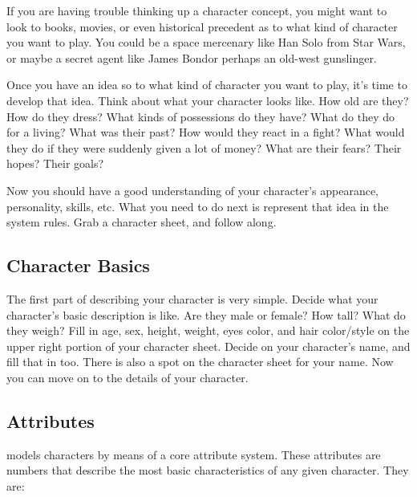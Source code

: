 \documentclass[twoside]{book}
\begin{document}
    {  
    If you are having trouble thinking up a character
             concept, you might want to look to books, movies, or even
             historical precedent as to what kind of character you want
             to play. You could be a space mercenary like Han Solo from
             Star Wars, or maybe a secret agent like James Bondor
             perhaps an old-west gunslinger. 
    }
  
    {  
    Once you have an idea so to what kind of character you
             want to play, it's time to develop that idea. Think
             about what your character looks like. How old are they? How
             do they dress? What kinds of possessions do they have? What
             do they do for a living? What was their past? How would they
             react in a fight? What would they do if they were suddenly
             given a lot of money? What are their fears? Their hopes?
             Their goals? 
    }
  
    {  
    Now you should have a good understanding of your
            character's appearance, personality, skills, etc. What
            you need to do next is represent that idea in the \APATHY{} 
            system rules. Grab a character sheet, and follow along.
          
    }
  
    

\subsection{Character Basics}
    
    {  
    The first part of describing your character is very
               simple. Decide what your character's basic
               description is like. Are they male or female? How tall?
               What do they weigh? Fill in age, sex, height, weight, eyes
               color, and hair color/style on the upper right portion of
               your character sheet. Decide on your character's
               name, and fill that in too. There is also a spot on the
               character sheet for your name. Now you can move on to the
               details of your character. 
    }
  
    

\subsection{Attributes}
    
    {  
    \APATHY{}  models characters by means of a core
              attribute system. These attributes are numbers that
              describe the most basic characteristics of any given
              character. They are:
            
    }
  
\end{document}
